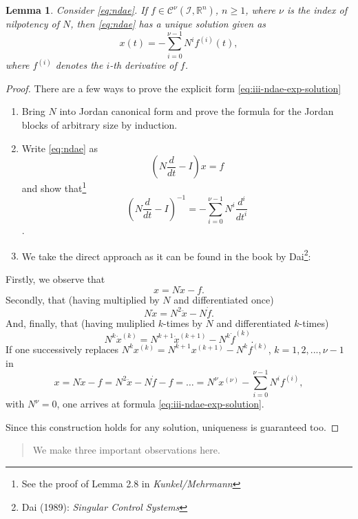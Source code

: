 \documentclass[]{book}
\newenvironment {JHSAYS} [0] {\begin{quote}\color{jhsc}} {\end{quote}}
\newtheorem{lemma}{Lemma}[chapter]
\theoremstyle{definition}
\theoremstyle{definition}
\theoremstyle{definition}
\theoremstyle{definition}
\theoremstyle{remark}
\begin{document}
\begin{lemma}
\protect\hypertarget{lem:ndae-explicit-solution}{}{\label{lem:ndae-explicit-solution} }Consider \eqref{eq:ndae}. If \(f \in \mathcal C^\nu(\mathcal I, \mathbb R^{n})\), \(n\geq 1\), where \(\nu\) is the index of nilpotency of \(N\), then \eqref{eq:ndae} has a unique solution given as
\begin{equation}
x(t) = - \sum_{i=0}^{\nu-1}N^if^{(i)}(t), \label{eq:iii-ndae-exp-solution}
\end{equation}
where \(f^{(i)}\) denotes the \(i\)-th derivative of \(f\).
\end{lemma}

\begin{proof}
{}There are a few ways to prove the explicit form \eqref{eq:iii-ndae-exp-solution}

\begin{enumerate}
\def\labelenumi{\arabic{enumi}.}
\item
  Bring \(N\) into Jordan canonical form and prove the formula for the Jordan blocks of arbitrary size by induction.
\item
  Write \eqref{eq:ndae} as \[(N\frac{d}{dt}-I)x = f\] and show that\footnote{See the proof of Lemma 2.8 in \emph{Kunkel/Mehrmann}} \[(N\frac{d}{dt}-I)^{-1} = - \sum_{i=0}^{\nu-1}N^i\frac{d^i}{dt^i}\].
\item
  We take the direct approach as it can be found in the book by Dai\footnote{Dai (1989): \emph{Singular Control Systems}}:
\end{enumerate}

Firstly, we observe that
\[
x = N\dot x - f.
\]
Secondly, that (having multiplied by \(N\) and differentiated once)
\[
N\dot x = N^2 \ddot x - N \dot f.
\]
And, finally, that (having muliplied \(k\)-times by \(N\) and differentiated \(k\)-times)
\[
N^k\dot x^{(k)} = N^{k+1} \dot x^{(k+1)} - N^k \dot f^{(k)}.
\]
If one successively replaces \(N^kx^{(k)}=N^{k+1}x^{(k+1)}-N^kf^{(k)}\), \(k=1,2,...,\nu-1\) in
\[
x=N\dot x -f = N^2\ddot x - N\dot f -f = \dots = N^\nu x^{(\nu)} - \sum_{i=0}^{\nu-1} N^if^{(i)},
\]
with \(N^\nu=0\), one arrives at formula \eqref{eq:iii-ndae-exp-solution}.

Since this construction holds for any solution, uniqueness is guaranteed too.
\end{proof}

\begin{JHSAYS}
We make three important observations here.
\end{JHSAYS}
\end{document}
